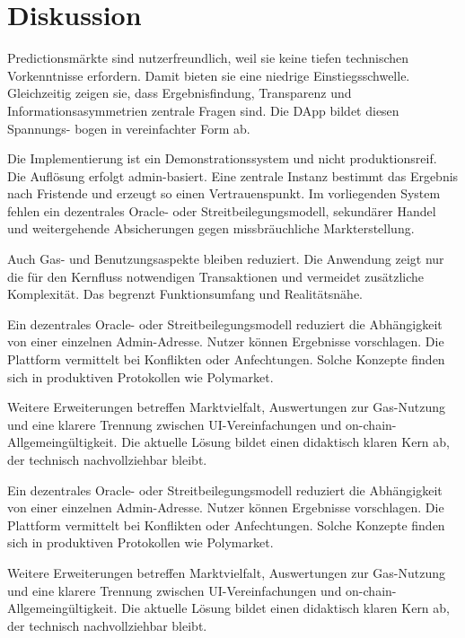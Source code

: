 \section{Diskussion}
\label{chap:sicherheit}

Predictionsmärkte sind nutzerfreundlich, weil sie keine tiefen technischen
Vorkenntnisse erfordern. Damit bieten sie eine niedrige Einstiegsschwelle.
Gleichzeitig zeigen sie, dass Ergebnisfindung, Transparenz und
Informationsasymmetrien zentrale Fragen sind. Die DApp bildet diesen Spannungs-
bogen in vereinfachter Form ab.

Die Implementierung ist ein Demonstrationssystem und nicht produktionsreif.
Die Auflösung erfolgt admin-basiert. Eine zentrale Instanz bestimmt das Ergebnis
nach Fristende und erzeugt so einen Vertrauenspunkt. Im vorliegenden System
fehlen ein dezentrales Oracle- oder Streitbeilegungsmodell, sekundärer Handel
und weitergehende Absicherungen gegen missbräuchliche Markterstellung.

Auch Gas- und Benutzungsaspekte bleiben reduziert. Die Anwendung zeigt nur die
für den Kernfluss notwendigen Transaktionen und vermeidet zusätzliche
Komplexität. Das begrenzt Funktionsumfang und Realitätsnähe.

Ein dezentrales Oracle- oder Streitbeilegungsmodell reduziert die Abhängigkeit
von einer einzelnen Admin-Adresse. Nutzer können Ergebnisse vorschlagen. Die
Plattform vermittelt bei Konflikten oder Anfechtungen. Solche Konzepte finden
sich in produktiven Protokollen wie Polymarket.

Weitere Erweiterungen betreffen Marktvielfalt, Auswertungen zur Gas-Nutzung und
eine klarere Trennung zwischen UI-Vereinfachungen und on-chain-Allgemeingültigkeit.
Die aktuelle Lösung bildet einen didaktisch klaren Kern ab, der technisch
nachvollziehbar bleibt.

Ein dezentrales Oracle- oder Streitbeilegungsmodell reduziert die Abhängigkeit
von einer einzelnen Admin-Adresse. Nutzer können Ergebnisse vorschlagen. Die
Plattform vermittelt bei Konflikten oder Anfechtungen. Solche Konzepte finden
sich in produktiven Protokollen wie Polymarket.

Weitere Erweiterungen betreffen Marktvielfalt, Auswertungen zur Gas-Nutzung und
eine klarere Trennung zwischen UI-Vereinfachungen und on-chain-Allgemeingültigkeit.
Die aktuelle Lösung bildet einen didaktisch klaren Kern ab, der technisch
nachvollziehbar bleibt.